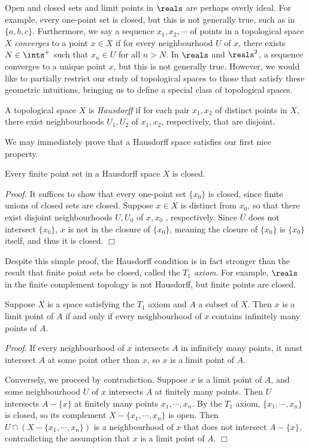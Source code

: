 Open and closed sets and limit points in $\reals$ are perhaps overly ideal. For example, every one-point set is closed, but this is not generally true, such as in $\{a, b, c\}$. Furthermore, we say a sequence $x_1, x_2, \cdots$ of points in a topological space $X$ {\it converges} to a point $x \in X$ if for every neighbourhood $U$ of $x$, there exists $N \in \ints^+$ such that $x_n \in U$ for all $n > N$. In $\reals$ and $\reals^2$, a sequence converges to a unique point $x$, but this is not generally true. However, we would like to partially restrict our study of topological spaces to those that satisfy these geometric intuitions, bringing us to define a special class of topological spaces.
\begin{definition}\label{2.29}
    A topological space $X$ is {\it Hausdorff} if for each pair $x_1, x_2$ of distinct points in $X$, there exist neighbourhoods $U_1, U_2$ of $x_1, x_2$, respectively, that are disjoint.
\end{definition}
We may immediately prove that a Hausdorff space satisfies our first nice property.
\begin{theorem}\label{2.30}
    Every finite point set in a Hausdorff space $X$ is closed.
\end{theorem}
{\it Proof.} It suffices to show that every one-point set $\{x_0\}$ is closed, since finite unions of closed sets are closed. Suppose $x \in X$ is distinct from $x_0$, so that there exist disjoint neighbourhoods $U, U_0$ of $x, x_0$ , respectively. Since $U$ does not intersect $\{x_0\}$, $x$ is not in the closure of $\{x_0\}$, meaning the closure of $\{x_0\}$ is $\{x_0\}$ itself, and thus it is closed. $\Box$

Despite this simple proof, the Hausdorff condition is in fact stronger than the result that finite point sets be closed, called the {\it $T_1$ axiom}. For example, $\reals$ in the finite complement topology is not Hausdorff, but finite points are closed.
\begin{theorem}\label{2.31}
    Suppose $X$ is a space satisfying the $T_1$ axiom and $A$ a subset of $X$. Then $x$ is a limit point of $A$ if and only if every neighbourhood of $x$ contains infinitely many points of $A$.
\end{theorem}
{\it Proof.} If every neighbourhood of $x$ intersects $A$ in infinitely many points, it must intersect $A$ at some point other than $x$, so $x$ is a limit point of $A$.

Conversely, we proceed by contradiction. Suppose $x$ is a limit point of $A$, and some neighbourhood $U$ of $x$ intersects $A$ at finitely many points. Then $U$ intersects $A - \{x\}$ at finitely many points $x_1, \cdots, x_n$. By the $T_1$ axiom, $\{x_1, \cdots, x_n\}$ is closed, so its complement $X - \{x_1, \cdots, x_n\}$ is open. Then $U \cap (X - \{x_1, \cdots, x_n\})$ is a neighbourhood of $x$ that does not intersect $A - \{x\}$, contradicting the assumption that $x$ is a limit point of $A$. $\Box$

